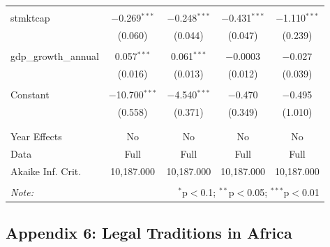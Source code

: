 \documentclass[a4paper, nobind]{templates/ociamthesis}
\begin{document}
\begin{table}[!htbp]
\begin{tabular}{@{\extracolsep{5pt}}lcccc}
  & & & & \\ 
 stmktcap & $-$0.269$^{***}$ & $-$0.248$^{***}$ & $-$0.431$^{***}$ & $-$1.110$^{***}$ \\ 
  & (0.060) & (0.044) & (0.047) & (0.239) \\ 
  & & & & \\ 
 gdp\_growth\_annual & 0.057$^{***}$ & 0.061$^{***}$ & $-$0.0003 & $-$0.027 \\ 
  & (0.016) & (0.013) & (0.012) & (0.039) \\ 
  & & & & \\ 
 Constant & $-$10.700$^{***}$ & $-$4.540$^{***}$ & $-$0.470 & $-$0.495 \\ 
  & (0.558) & (0.371) & (0.349) & (1.010) \\ 
  & & & & \\ 
\hline \\[-1.8ex] 
Year Effects & No & No & No & No \\ 
Data & Full & Full & Full & Full \\ 
Akaike Inf. Crit. & 10,187.000 & 10,187.000 & 10,187.000 & 10,187.000 \\ 
\hline 
\hline \\[-1.8ex] 
\textit{Note:}  & \multicolumn{4}{r}{$^{*}$p$<$0.1; $^{**}$p$<$0.05; $^{***}$p$<$0.01} \\ 
\end{tabular} 
\end{table}

\newpage

\hypertarget{appendix-6-legal-traditions-in-africa}{%
\subsection{Appendix 6: Legal Traditions in Africa}\label{appendix-6-legal-traditions-in-africa}}
\end{document}
